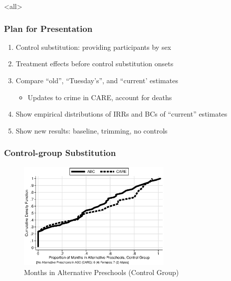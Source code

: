 \documentclass[static]{JJH-Beamer}
\begin{document}
\renewcommand*{\inserttotalframenumber}{\pageref{lastframe}}
\mode<all>{\theTitlePages} %



\begin{frame}
\frametitle{Plan for Presentation}
\begin{enumerate}
	\item Control substitution: providing participants by sex
	\item Treatment effects before control substitution onsets
	\item Compare ``old'', ``Tuesday's'', and ``current'  estimates
		\begin{itemize}
				\item Updates to crime in CARE, account for deaths 
		\end{itemize}
	\item Show empirical distributions of IRRs and BCs of ``current'' estimates
	\item Show new results: baseline, trimming, no controls
\end{enumerate}
\end{frame}


\begin{frame}
\frametitle{Control-group Substitution}\label{substitution}
\begin{figure}
\caption{Months in Alternative Preschools (Control Group)}
	\includegraphics[width=20em]{output/abccare_controlcontamination.eps}
\end{figure}
\hyperlink{abc_subsidized}{}
\hyperlink{care_subsidized}{}
\end{frame}
\end{document}
